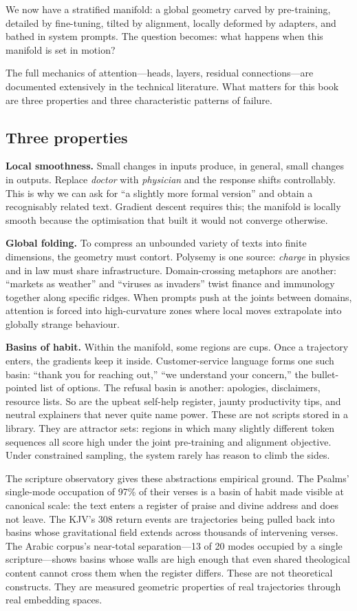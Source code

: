 We now have a stratified manifold: a global geometry carved by pre-training, detailed by fine-tuning, tilted by alignment, locally deformed by adapters, and bathed in system prompts. The question becomes: what happens when this manifold is set in motion?

The full mechanics of attention---heads, layers, residual connections---are documented extensively in the technical literature. What matters for this book are three properties and three characteristic patterns of failure.

\subsection{Three properties}

\textbf{Local smoothness.} Small changes in inputs produce, in general, small changes in outputs. Replace \emph{doctor} with \emph{physician} and the response shifts controllably. This is why we can ask for ``a slightly more formal version'' and obtain a recognisably related text. Gradient descent requires this; the manifold is locally smooth because the optimisation that built it would not converge otherwise.

\textbf{Global folding.} To compress an unbounded variety of texts into finite dimensions, the geometry must contort. Polysemy is one source: \emph{charge} in physics and in law must share infrastructure. Domain-crossing metaphors are another: ``markets as weather'' and ``viruses as invaders'' twist finance and immunology together along specific ridges. When prompts push at the joints between domains, attention is forced into high-curvature zones where local moves extrapolate into globally strange behaviour.

\textbf{Basins of habit.} Within the manifold, some regions are cups. Once a trajectory enters, the gradients keep it inside. Customer-service language forms one such basin: ``thank you for reaching out,'' ``we understand your concern,'' the bullet-pointed list of options. The refusal basin is another: apologies, disclaimers, resource lists. So are the upbeat self-help register, jaunty productivity tips, and neutral explainers that never quite name power. These are not scripts stored in a library. They are attractor sets: regions in which many slightly different token sequences all score high under the joint pre-training and alignment objective. Under constrained sampling, the system rarely has reason to climb the sides.

The scripture observatory gives these abstractions empirical ground. The Psalms' single-mode occupation of 97\% of their verses is a basin of habit made visible at canonical scale: the text enters a register of praise and divine address and does not leave. The KJV's 308 return events are trajectories being pulled back into basins whose gravitational field extends across thousands of intervening verses. The Arabic corpus's near-total separation---13 of 20 modes occupied by a single scripture---shows basins whose walls are high enough that even shared theological content cannot cross them when the register differs. These are not theoretical constructs. They are measured geometric properties of real trajectories through real embedding spaces.


